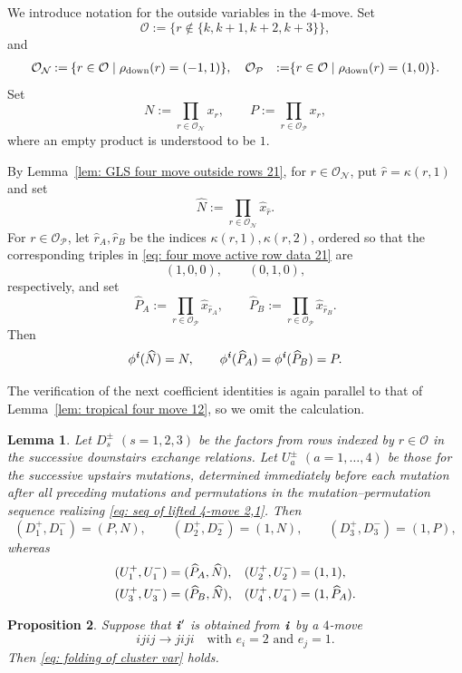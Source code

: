 \documentclass[12pt, leqno]{amsart}
\numberwithin{equation}{section}
\theoremstyle{plain}
\newtheorem{lemma}{Lemma}[section]
\newtheorem{proposition}[lemma]{Proposition}
\theoremstyle{definition}
\newcommand{\seteq}{\mathbin{:=}}
\newcommand{\ii}{ \textbf{\textit{i}}}
\newcommand{\hN}{\widehat{N}}
\newcommand{\hP}{\widehat{P}}
\newcommand{\hr}{\widehat{r}}
\newcommand{\hx}{\widehat{x}}
\newcommand{\calN}{\mathcal{N}}
\newcommand{\calO}{\mathcal{O}}
\newcommand{\calP}{\mathcal{P}}
\begin{document}
We introduce notation for the outside variables in the $4$-move. Set
\[
\calO\seteq\{r\notin\{k,k+1,k+2,k+3\}\},
\]
and
\begin{align*}
\calO_{\calN}&\seteq \{r\in\calO\mid\rho_{\rm down}(r)=(-1,1)\},\quad
\calO_{\calP}&\seteq \{r\in\calO\mid\rho_{\rm down}(r)=(1,0)\}.
\end{align*}
Set
\[
N\seteq\prod_{r\in\calO_{\calN}}x_r, \qquad P\seteq\prod_{r\in\calO_{\calP}}x_r,
\]
where an empty product is understood to be $1$.

By Lemma~\ref{lem: GLS four move outside rows 21},  for $r\in\calO_{\calN}$, put $\hr=\kappa(r,1)$ and set
\[
\hN\seteq\prod_{r\in\calO_{\calN}}\hx_{\hr}.
\]
 For $r\in\calO_{\calP}$, let $\hr_A,\hr_B$ be the indices
$\kappa(r,1),\kappa(r,2)$, ordered so that the corresponding triples in \eqref{eq: four move active row data 21}
are
\[
(1,0,0),\qquad (0,1,0),
\]
respectively, and set
\[
\hP_A\seteq\prod_{r\in\calO_{\calP}}\hx_{\hr_A}, \qquad \hP_B\seteq\prod_{r\in\calO_{\calP}}\hx_{\hr_B}.
\]
Then
\[
\phi^\ii(\hN)=N, \qquad \phi^\ii(\hP_A)=\phi^\ii(\hP_B)=P.
\]

The verification of the next coefficient identities is again parallel
to that of Lemma~\ref{lem: tropical four move 12}, so we omit the
calculation.

\begin{lemma}\label{lem: tropical four move 21}
Let $D_s^\pm$ $(s=1,2,3)$ be the factors from  rows indexed by $r\in\calO$ in the
successive downstairs exchange relations. Let $U_a^\pm$ $(a=1,\ldots,4)$
be those for the successive upstairs mutations, determined immediately
before each mutation after all preceding mutations and permutations
 in the mutation--permutation sequence realizing \eqref{eq: seq of lifted 4-move 2,1}. Then
\[
(D_1^+,D_1^-)=(P,N),\qquad (D_2^+,D_2^-)=(1,N),\qquad (D_3^+,D_3^-)=(1,P),
\]
whereas
\begin{align*}
(U_1^+,U_1^-)&=(\hP_A,\hN),&
(U_2^+,U_2^-)&=(1,1),\allowdisplaybreaks\\
(U_3^+,U_3^-)&=(\hP_B,\hN),&
(U_4^+,U_4^-)&=(1,\hP_A).
\end{align*}
\end{lemma}

\begin{proposition}\label{prop: cluster folding four move 21}
Suppose that $\ii'$ is obtained from $\ii$ by a $4$-move
\[
ijij\longrightarrow jiji \quad\text{with $e_i=2$ and $e_j=1$.}
\]
Then \eqref{eq: folding of cluster var} holds.
\end{proposition}
\end{document}
